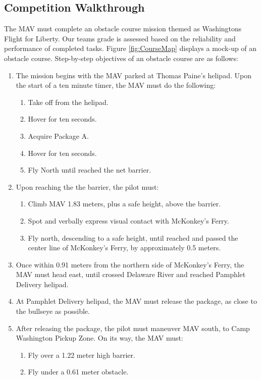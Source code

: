 \documentclass[onecolumn, oneside, letterpaper, draftclsnofoot, 10pt, compsoc]{IEEEtran}
\begin{document}
\subsection{Competition Walkthrough}
The MAV must complete an obstacle course mission themed as Washington\textquotesingle s Flight for Liberty. Our team\textquotesingle s grade is assessed based on the reliability and performance of completed tasks. Figure \ref{fig:CourseMap} displays a mock-up of an obstacle course. Step-by-step objectives of an obstacle course are as follows:
\begin{enumerate}
\item The mission begins with the MAV parked at Thomas Paine’s helipad. Upon the start of a ten minute timer, the MAV must do the following:
\begin{enumerate}
\item Take off from the helipad.
\item Hover for ten seconds.
\item Acquire Package A.
\item Hover for ten seconds.
\item Fly North until reached the net barrier.
\end{enumerate}
\item Upon reaching the the barrier, the pilot must:
\begin{enumerate}
\item Climb MAV 1.83 meters, plus a safe height, above the barrier.
\item Spot and verbally express visual contact with McKonkey’s Ferry.
\item Fly north, descending to a safe height, until reached and passed the center line of McKonkey’s Ferry, by approximately 0.5 meters.
\end{enumerate}
\item Once within 0.91 meters from the northern side of McKonkey’s Ferry, the MAV must head east, until crossed Delaware River and reached Pamphlet Delivery helipad.
\item At Pamphlet Delivery helipad, the MAV must release the package, as close to the bullseye as possible.
\item After releasing the package, the pilot must maneuver MAV south, to Camp Washington Pickup Zone. On its way, the MAV must:
\begin{enumerate}
\item Fly over a 1.22 meter high barrier.
\item Fly under a 0.61 meter obstacle.

\end{enumerate}
\end{enumerate}
\end{document}
